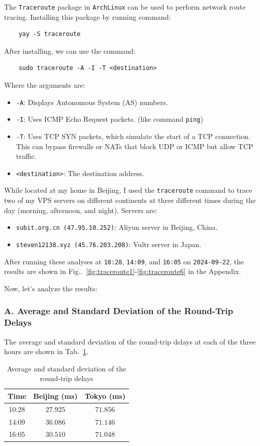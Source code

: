 \documentclass{cshwk}
\begin{document}
The \texttt{Traceroute} package in \texttt{ArchLinux} can be used to perform network route tracing. Installing this package by running command:
\begin{verbatim}
    yay -S traceroute
\end{verbatim}
After installing, we can use the command:
\begin{verbatim}
    sudo traceroute -A -I -T <destination>
\end{verbatim}
Where the arguments are:
\begin{itemize}
    \item \texttt{-A}: Displays Autonomous System (AS) numbers.
    \item \texttt{-I}: Uses ICMP Echo Request packets. (like command \texttt{ping})
    \item \texttt{-T}: Uses TCP SYN packets, which simulate the start of a TCP connection. This can bypass firewalls or NATs that block UDP or ICMP but allow TCP traffic.
    \item \texttt{<destination>}: The destination address.
\end{itemize}
While located at my home in Beijing, I used the \texttt{traceroute} command to trace two of my VPS servers on different continents at three different times during the day (morning, afternoon, and night). Servers are:
\begin{itemize}
    \item \texttt{subit.org.cn (47.95.10.252)}: Aliyun server in Beijing, China.
    \item \texttt{steven12138.xyz (45.76.203.208)}: Vultr server in Japan.
\end{itemize}
After running these analyses at \texttt{10:28}, \texttt{14:09}, and \texttt{16:05} on \texttt{2024-09-22}, the results are shown in Fig..~\ref{fig:traceroute1}-\ref{fig:traceroute6} in the Appendix.

Now, let's analyze the results:

\subsubsection*{A. Average and Standard Deviation of the Round-Trip Delays}
The average and standard deviation of the round-trip delays at each of the three hours are shown in Tab.~\ref{tab:delay}.
\begin{table}[H]
    \centering
    \begin{tabular}{ccc}
        \hline
        Time  & Beijing (ms) & Tokyo (ms) \\
        \hline
        10:28 & $27.925$     & $71.856$   \\
        14:09 & $36.086$     & $71.146$   \\
        16:05 & $30.510$     & $71.048$   \\
        \hline
    \end{tabular}
    \caption{Average and standard deviation of the round-trip delays}
    \label{tab:delay}
\end{table}
\end{document}
